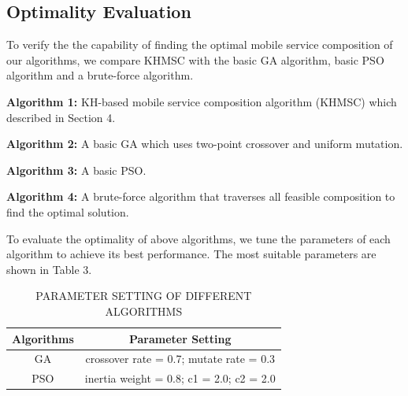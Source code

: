 \documentclass[10pt,journal,compsoc]{IEEEtran}
\begin{document}
\subsection{Optimality Evaluation}
To verify the the capability of finding the optimal mobile service composition of our algorithms, we compare KHMSC with the basic GA algorithm, basic PSO algorithm and a brute-force algorithm.

\textbf{Algorithm 1:} KH-based mobile service composition algorithm (KHMSC) which described in Section 4.

\textbf{Algorithm 2:} A basic GA which uses two-point crossover and uniform mutation.

\textbf{Algorithm 3:} A basic PSO.

\textbf{Algorithm 4:} A brute-force algorithm that traverses all feasible composition to find the optimal solution.

To evaluate the optimality of above algorithms, we tune the parameters of each algorithm to achieve its best performance. The most suitable parameters are shown in Table 3.

\begin{table}[!t]
\renewcommand{\arraystretch}{1.3}
\caption{PARAMETER SETTING OF DIFFERENT ALGORITHMS}
\label{table_example}
\centering
\begin{tabular}{cc}
\hline
\bfseries Algorithms & \bfseries Parameter Setting \\
\hline
GA  & crossover rate = 0.7; mutate rate = 0.3 \\
PSO & inertia weight = 0.8; c1 = 2.0; c2 = 2.0 \\
\hline
\end{tabular}
\end{table}
\end{document}
